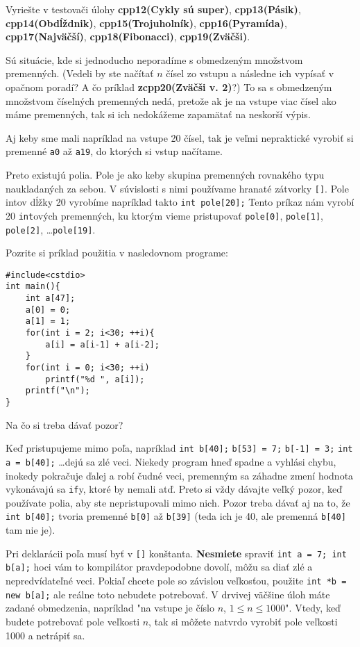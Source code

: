 Vyriešte v testovači úlohy \textbf{cpp12(Cykly sú super)}, \textbf{cpp13(Pásik)},
\textbf{cpp14(Obdĺždnik)}, \textbf{cpp15(Trojuholník)}, \textbf{cpp16(Pyramída)}, 
\textbf{cpp17(Najväčší)}, \textbf{cpp18(Fibonacci)}, \textbf{cpp19(Zväčši)}.


Sú situácie, kde si jednoducho neporadíme s obmedzeným množstvom premenných.
(Vedeli by ste načítať $n$ čísel zo vstupu a následne ich vypísať v opačnom
poradí? A čo príklad \textbf{zcpp20(Zväčši v. 2)}?) To sa s obmedzeným množstvom číselných
premenných nedá, pretože ak je na vstupe viac čísel ako máme premenných, tak si
ich nedokážeme zapamätať na neskorší výpis. 

Aj keby sme mali napríklad na vstupe 20 čísel, tak je veľmi nepraktické vyrobiť
si premenné \verb!a0! až \verb!a19!, do ktorých si vstup načítame.

Preto existujú polia. Pole je ako keby skupina premenných rovnakého typu
naukladaných za sebou. V súvislosti s nimi používame hranaté zátvorky
\verb![]!. Pole intov dĺžky 20 vyrobíme napríklad takto \verb!int pole[20];!
Tento príkaz nám vyrobí 20 \verb!int!ových premenných, ku ktorým vieme pristupovať
\verb!pole[0]!, \verb!pole[1]!, \verb!pole[2]!, \dots \verb!pole[19]!.

Pozrite si príklad použitia v nasledovnom programe:
\begin{lstlisting}
#include<cstdio>
int main(){
    int a[47];
    a[0] = 0;
    a[1] = 1;
    for(int i = 2; i<30; ++i){
        a[i] = a[i-1] + a[i-2];
    }
    for(int i = 0; i<30; ++i)
        printf("%d ", a[i]);
    printf("\n");
}
\end{lstlisting}

Na čo si treba dávať pozor?

Keď pristupujeme mimo poľa, napríklad \verb!int b[40];! \verb!b[53] = 7;!
\verb!b[-1] = 3;! \verb!int a = b[40];! \dots dejú sa zlé veci. Niekedy program
hneď spadne a vyhlási chybu, inokedy pokračuje ďalej a robí čudné veci,
premenným sa záhadne zmení hodnota vykonávajú sa \verb!if!y, ktoré by nemali
atď.  Preto si vždy dávajte veľký pozor, keď používate polia, aby ste
nepristupovali mimo nich.  Pozor treba dávať aj na to, že \verb!int b[40];!
tvoria premenné \verb!b[0]! až \verb!b[39]!  (teda ich je 40, ale premenná
\verb!b[40]! tam nie je).

Pri deklarácii poľa musí byť v \verb![]! konštanta.  \textbf{Nesmiete} spraviť
\verb!int a = 7; int b[a];! hoci vám to kompilátor pravdepodobne dovolí, môžu
sa diať zlé a nepredvídateľné veci.  Pokiaľ chcete pole so závislou veľkosťou,
použite \verb!int *b = new b[a];! ale reálne toto nebudete potrebovať. V
drvivej väčšine úloh máte zadané obmedzenia, napríklad "na vstupe je číslo $n$,
$1\leq n\leq 1000$". Vtedy, keď budete potrebovať pole veľkosti $n$, tak si
môžete natvrdo vyrobiť pole veľkosti 1000 a netrápiť sa.

